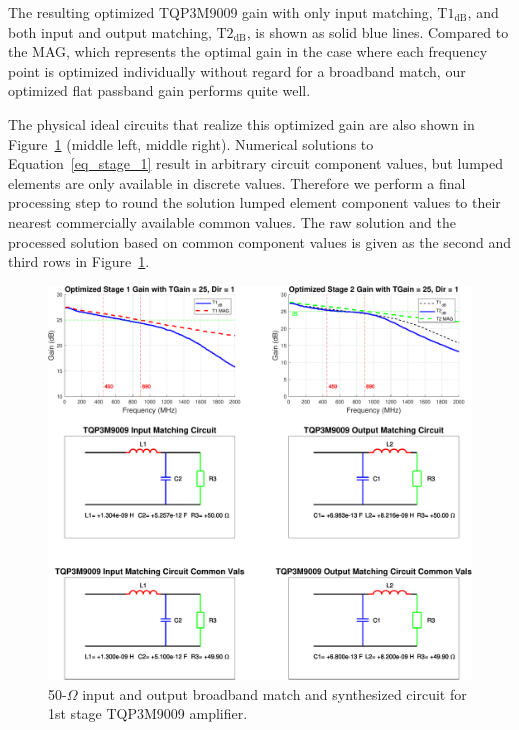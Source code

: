 	The resulting optimized TQP3M9009 gain with only input matching, $\text{T1}_{\text{dB}}$, and both input and output matching, $\text{T2}_{\text{dB}}$, is shown as solid blue lines.
	Compared to the \ac{MAG}, which represents the optimal gain in the case where each frequency point is optimized individually without regard for a broadband match, our optimized flat passband gain performs quite well.
	
	The physical ideal circuits that realize this optimized gain are also shown in Figure~\ref{fig_srft_tqp} (middle left, middle right).
	Numerical solutions to Equation~\ref{eq_stage_1} result in arbitrary circuit component values, but lumped elements are only available in discrete values.
	Therefore we perform a final processing step to round the solution lumped element component values to their nearest commercially available common values.
	The raw solution and the processed solution based on common component values is given as the second and third rows in Figure~\ref{fig_srft_tqp}.




\begin{figure}[p]
\centering
  \includegraphics[width=1\linewidth]{figs/matching/14-Oct-2018_TQP3M9009_srft_results_sequential}   
    \caption{50-$\Omega$ input and output broadband match and synthesized circuit for 1st stage TQP3M9009 amplifier.}
\label{fig_srft_tqp}
\end{figure}


